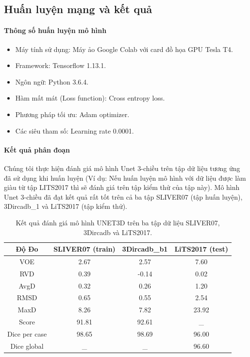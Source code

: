 \subsection{Huấn luyện mạng và kết quả}
\paragraph{Thông số huấn luyện mô hình}
\begin{itemize}
\item Máy tính sử dụng: Máy ảo Google Colab với card đồ họa GPU Tesla T4.
\item Framework: Tensorflow 1.13.1.
\item Ngôn ngữ: Python 3.6.4.
\item Hàm mất mát (Loss function): Cross entropy loss.
\item Phương pháp tối ưu: Adam optimizer.
\item Các siêu tham số: Learning rate 0.0001.
\end{itemize}
\paragraph{Kết quả phân đoạn}
Chúng tôi thực hiện đánh giá mô hình Unet 3-chiều trên tập dữ liệu tương ứng đã sử dụng khi huấn luyện (Ví dụ: Nếu huấn luyện mô hình với dữ liệu được làm giàu từ tập LITS2017 thì sẽ đánh giá trên tập kiểm thử của tập này). Mô hình Unet 3-chiều đã đạt kết quả rất tốt trên cả ba tập SLIVER07 (tập huấn luyện), 3Dircadb\_1 và LiTS2017 (tập kiểm thử). 
\begin{table}[]
\begin{tabular}{|c|c|c|c|}
\hline
\textbf{Độ Đo} & \textbf{SLIVER07 (train)} & \textbf{3Dircadb\_b1} & \textbf{LiTS2017 (test)} \\ \hline
VOE            & 2.67                      & 2.57                  & 7.60                     \\ \hline
RVD            & 0.39                      & -0.14                 & 0.02                     \\ \hline
AvgD           & 0.32                      & 0.26                  & 1.20                     \\ \hline
RMSD           & 0.65                      & 0.55                  & 2.54                     \\ \hline
MaxD           & 8.26                      & 7.82                  & 23.92                    \\ \hline
Score          & 91.81                     & 92.61                 & \_                       \\ \hline
Dice per case  & 98.65                     & 98.69                 & 96.00                    \\ \hline
Dice global    & \_                        & \_                    & 96.60                     \\ \hline
\end{tabular}
\caption{\label{tab:CNN-SLIVER07_Test}Kết quả đánh giá mô hình UNET3D trên ba tập dữ liệu SLIVER07, 3Dircadb và LiTS2017.}
\end{table}



